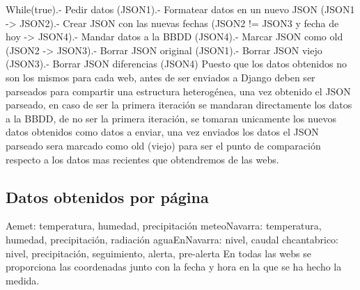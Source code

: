 While(true).- Pedir datos (JSON1).- Formatear datos en un nuevo JSON (JSON1 -> JSON2).- Crear JSON con las nuevas fechas (JSON2 != JSON3 y fecha de hoy -> JSON4).- Mandar datos a la BBDD (JSON4).- Marcar JSON como old (JSON2 -> JSON3).- Borrar JSON original (JSON1).- Borrar JSON viejo (JSON3).- Borrar JSON diferencias (JSON4)\newline
\newline
\newline
Puesto que los datos obtenidos no son los mismos para cada web, antes de ser enviados a Django deben ser parseados para compartir una estructura heterogénea, una vez obtenido el JSON parseado, en caso de ser la primera iteración se mandaran directamente los datos a la BBDD, de no ser la primera iteración, se tomaran unicamente los nuevos datos obtenidos como datos a enviar, una vez enviados los datos el JSON parseado sera marcado como old (viejo) para ser el punto de comparación respecto a los datos mas recientes que obtendremos de las webs.

\subsection{Datos obtenidos por página}
Aemet:\newline
temperatura, humedad, precipitación
\newline\newline
meteoNavarra:\newline
temperatura, humedad, precipitación, radiación
\newline\newline
aguaEnNavarra:\newline
nivel, caudal
\newline\newline
chcantabrico:\newline
nivel, precipitación, seguimiento, alerta, pre-alerta
\newline\newline
En todas las webs se proporciona las coordenadas junto con la fecha y hora en la que se ha hecho la medida.

